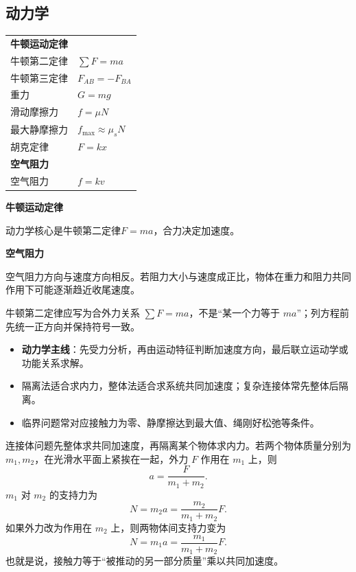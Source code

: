 
\subsection{动力学}
\begin{tabularx}{\columnwidth}{XX}
  \multicolumn{2}{l}{\textbf{牛顿运动定律}}\\
  牛顿第二定律&$\sum F=ma$\\
  牛顿第三定律&$F_{AB}=-F_{BA}$\\
  重力&$G=mg$\\
  滑动摩擦力&$f=\mu N$\\
  最大静摩擦力&$f_{\max}\approx \mu_s N$\\
  胡克定律&$F=kx$\\
  \multicolumn{2}{l}{\textbf{空气阻力}}\\
  空气阻力&$f=kv$\\
\end{tabularx}

\textbf{牛顿运动定律}

动力学核心是牛顿第二定律$F=ma$，合力决定加速度。

\textbf{空气阻力}

空气阻力方向与速度方向相反。若阻力大小与速度成正比，物体在重力和阻力共同作用下可能逐渐趋近收尾速度。

\begin{formulanotebox}
牛顿第二定律应写为合外力关系 $\sum F=ma$，不是“某一个力等于 $ma$”；列方程前先统一正方向并保持符号一致。
\end{formulanotebox}

\begin{keypointbox}
\begin{itemize}[leftmargin=1.5em]
  \item \textbf{动力学主线}：先受力分析，再由运动特征判断加速度方向，最后联立运动学或功能关系求解。
  \item 隔离法适合求内力，整体法适合求系统共同加速度；复杂连接体常先整体后隔离。
  \item 临界问题常对应接触力为零、静摩擦达到最大值、绳刚好松弛等条件。
\end{itemize}
\end{keypointbox}

\begin{casetypebox}[title={\strut\textcolor{white}{\bfseries 常见题型：连接体的整体法与隔离法}}]
连接体问题先整体求共同加速度，再隔离某个物体求内力。若两个物体质量分别为 $m_1,m_2$，在光滑水平面上紧挨在一起，外力 $F$ 作用在 $m_1$ 上，则
\[
  a=\frac{F}{m_1+m_2}.
\]
$m_1$ 对 $m_2$ 的支持力为
\[
  N=m_2a=\frac{m_2}{m_1+m_2}F.
\]
如果外力改为作用在 $m_2$ 上，则两物体间支持力变为
\[
  N=m_1a=\frac{m_1}{m_1+m_2}F.
\]
也就是说，接触力等于“被推动的另一部分质量”乘以共同加速度。
\end{casetypebox}

